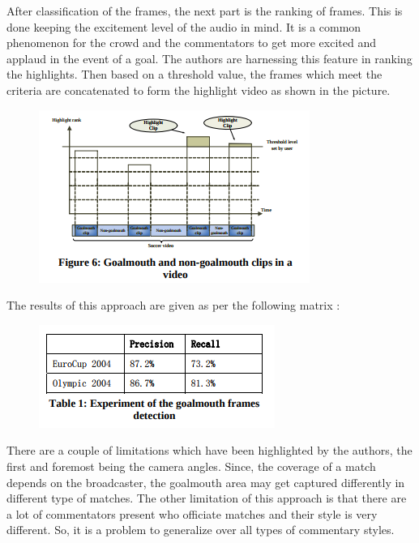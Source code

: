 \documentclass[twocolumn,showpacs,%
  nofootinbib,aps,superscriptaddress,%
  eqsecnum,prd,notitlepage,showkeys,10pt]{revtex4-1}
\begin{document}
After classification of the frames, the next part is the ranking of frames. This is done keeping the excitement level of the audio in mind. It is a common phenomenon for the crowd and the commentators to get more excited and applaud in the event of a goal. The authors are harnessing this feature in ranking the highlights. Then based on a threshold value, the frames which meet the criteria are concatenated to form the highlight video as shown in the picture.

\begin{figure}[h]
\includegraphics[width=\linewidth]{img4.png}
\end{figure}

The results of this approach are given as per the following matrix :

\begin{figure}[h]
\includegraphics[width=\linewidth]{img5.png}
\end{figure}

There are a couple of limitations which have been highlighted by the authors, the first and foremost being the camera angles. Since, the coverage of a match depends on the broadcaster, the goalmouth area may get captured differently in different type of matches. The other limitation of this approach is that there are a lot of commentators present who officiate matches and their style is very different. So, it is a problem to generalize over all types of commentary styles.
\end{document}
